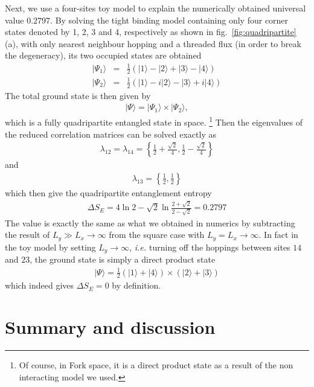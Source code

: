 \documentclass[doublecol]{epl2} %
\newcommand{\ie}{\textit{i.e.{ }}}
\begin{document}
Next, we use a four-sites toy model to explain the numerically obtained universal value $0.2797$. By solving the tight binding model containing only four corner states denoted by 1, 2, 3 and 4, respectively as shown in fig.~\ref{fig:quadripartite}(a), with only nearest neighbour hopping and a threaded flux (in order to break the degeneracy), \cite{Benalcazar_S_2017} its two occupied states are obtained 
\begin{eqnarray}
|\Psi_1\rangle&=&\frac12\left(|1\rangle-|2\rangle+|3\rangle-|4\rangle\right) \nonumber\\
|\Psi_2\rangle&=&\frac12\left(|1\rangle-i|2\rangle-|3\rangle+i|4\rangle\right) \nonumber
\end{eqnarray}
The total ground state is then given by
\begin{eqnarray}
|\Psi\rangle=|\Psi_1\rangle \times |\Psi_2\rangle,
\end{eqnarray}
which is a fully quadripartite entangled state in space. \footnote{Of course, in Fork space, it is a direct product state as a result of the non interacting model we used.} Then the eigenvalues of the reduced correlation matrices can be solved exactly as
\begin{eqnarray}
\lambda_{12}=\lambda_{14}=\left\{\frac{1}{2}+\frac{\sqrt{2}}{4},\frac{1}{2}-\frac{\sqrt{2}}{4}\right\} \nonumber
\end{eqnarray}
and
\begin{eqnarray}
\lambda_{13}=\left\{\frac{1}{2},\frac{1}{2}\right\} \nonumber
\end{eqnarray}
which then give the quadripartite entanglement entropy
\begin{eqnarray}
\Delta S_E= 4\ln2-\sqrt{2}\ln\frac{2+\sqrt{2}}{2-\sqrt{2}}=0.2797
\end{eqnarray}
The value is exactly the same as what we obtained in numerics by subtracting the result of $L_y\gg L_x\rightarrow\infty$ from the square case with $L_y=L_x\rightarrow\infty$. In fact in the toy model by setting $L_y\rightarrow\infty$, \ie turning off the hoppings between sites $14$ and
$23$, the ground state is simply a direct product state
\begin{eqnarray}
|\Psi\rangle=\frac12 \left(|1\rangle+|4\rangle\right) \times \left(|2\rangle+|3\rangle\right)
\end{eqnarray}
which indeed gives $\Delta S_E=0$ by definition. 

\section{Summary and discussion}
\end{document}
